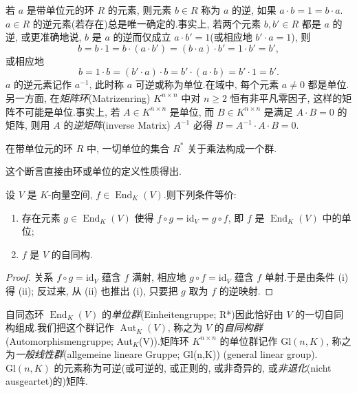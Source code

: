 若 $a$ 是带单位元的环 $R$ 的元素, 则元素 $b \in R$ 称为 $a$ 的逆, 如果 $a \cdot b = 1 = b \cdot a$.$a \in R$ 的逆元素(若存在)总是唯一确定的.事实上, 若两个元素 $b, b' \in R$ 都是 $a$ 的逆, 或更准确地说, $b$ 是 $a$ 的逆而仅成立 $a \cdot b' = 1$(或相应地 $b' \cdot a = 1$), 则
\[
b = b \cdot 1 = b \cdot (a \cdot b') = (b \cdot a) \cdot b' = 1 \cdot b' = b',
\]
或相应地
\[
b = 1 \cdot b = (b' \cdot a) \cdot b = b' \cdot (a \cdot b) = b' \cdot 1 = b'\text{.}
\]
$a$ 的逆元素记作 $a^{-1}$, 此时称 $a$ 可逆或称为单位.在域中, 每个元素 $a \neq 0$ 都是单位.另一方面, 在\emph{矩阵环}(\textup{Matrizenring}) $K^{n \times n}$ 中对 $n \geq 2$ 恒有非平凡零因子, 这样的矩阵不可能是单位.事实上, 若 $A \in K^{n \times n}$ 是单位, 而 $B \in K^{n \times n}$ 是满足 $A \cdot B = 0$ 的矩阵, 则用 $A$ 的\emph{逆矩阵}(\textup{inverse Matrix}) $A^{-1}$ 必得 $B = A^{-1} \cdot A \cdot B = 0$.

\begin{remark}\label{rem:3.3.3}
在带单位元的环 $R$ 中, 一切单位的集合 $R^*$ 关于乘法构成一个群.
\end{remark}

这个断言直接由环或单位的定义性质得出.

\begin{remark}\label{rem:3.3.4}
设 $V$ 是 $K$-向量空间, $f \in \operatorname{End}_K(V)$.则下列条件等价:
\begin{enumerate}
\item[(i)] 存在元素 $g \in \operatorname{End}_K(V)$ 使得 $f \circ g = \mathrm{id}_V = g \circ f$, 即 $f$ 是 $\operatorname{End}_K(V)$ 中的单位;
\item[(ii)] $f$ 是 $V$ 的自同构.
\end{enumerate}
\end{remark}

\begin{proof}
关系 $f \circ g = \mathrm{id}_V$ 蕴含 $f$ 满射, 相应地 $g \circ f = \mathrm{id}_V$ 蕴含 $f$ 单射.于是由条件 (i) 得 (ii); 反过来, 从 (ii) 也推出 (i), 只要把 $g$ 取为 $f$ 的逆映射.
\end{proof}

自同态环 $\operatorname{End}_K(V)$ 的\emph{单位群}(\textup{Einheitengruppe; R*})因此恰好由 $V$ 的一切自同构组成.我们把这个群记作 $\operatorname{Aut}_K(V)$, 称之为 $V$ 的\emph{自同构群}(\textup{Automorphismengruppe; Aut$_K$(V)}).矩阵环 $K^{n \times n}$ 的单位群记作 $\mathrm{Gl}(n, K)$, 称之为\emph{一般线性群}(\textup{allgemeine lineare Gruppe; Gl(n,K)}) (general linear group).$\mathrm{Gl}(n, K)$ 的元素称为可逆(或可逆的, 或正则的, 或非奇异的, 或\emph{非退化}(\textup{nicht ausgeartet})的)矩阵.

